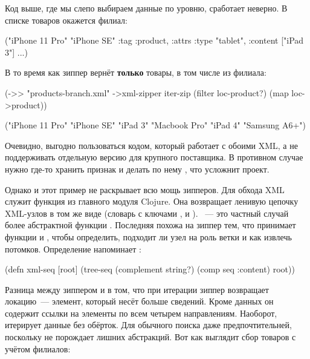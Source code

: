 Код выше, где мы слепо выбираем данные по уровню, сработает неверно. В списке
товаров окажется филиал:

\begin{english}
  \begin{clojure}
("iPhone 11 Pro"
 "iPhone SE"
 {:tag :product, :attrs {:type "tablet"}, :content ["iPad 3"]} ...)
  \end{clojure}
\end{english}

В то время как зиппер вернёт \textbf{только} товары, в том числе из филиала:

\begin{english}
  \begin{clojure}
(->> "products-branch.xml"
     ->xml-zipper
     iter-zip
     (filter loc-product?)
     (map loc->product))

("iPhone 11 Pro" "iPhone SE" "iPad 3" "Macbook Pro" "iPad 4" "Samsung A6+")
  \end{clojure}
\end{english}

Очевидно, выгодно пользоваться кодом, который работает с обоими XML, а не
поддерживать отдельную версию для крупного поставщика. В противном случае нужно
где-то хранить признак и делать по нему , что усложнит проект.

Однако и этот пример не раскрывает всю мощь зипперов. Для обхода XML служит
функция  из главного модуля Clojure. Она возвращает ленивую цепочку
XML-узлов в том же виде (словарь с ключами ,  и
). ~--- это частный случай более абстрактной функции
. Последняя похожа на зиппер тем, что принимает функции  и
, чтобы определить, подходит ли узел на роль ветки и как извлечь
потомков. Определение  напоминает :

\begin{english}
  \begin{clojure}
(defn xml-seq
  [root]
  (tree-seq
    (complement string?)
    (comp seq :content)
    root))
  \end{clojure}
\end{english}

Разница между зиппером и  в том, что при итерации зиппер возвращает
локацию~--- элемент, который несёт больше сведений. Кроме данных он содержит
ссылки на элементы по всем четырем направлениям. Наоборот,  итерирует
данные без обёрток. Для обычного поиска  даже предпочтительней,
поскольку не порождает лишних абстракций. Вот как выглядит сбор товаров с учётом
филиалов:

